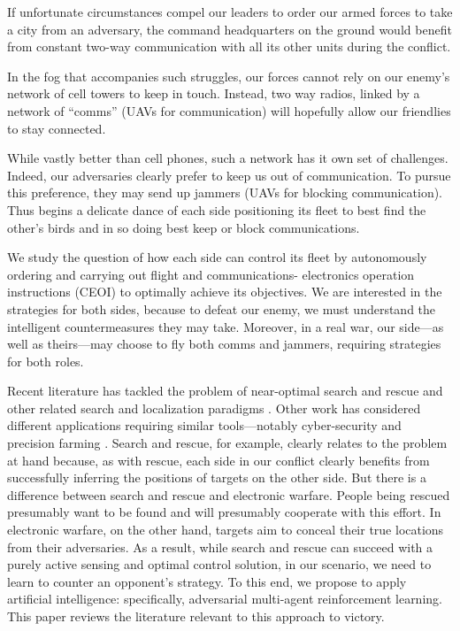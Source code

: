 \documentclass{article}
\begin{document}
If unfortunate circumstances compel our leaders to order our armed
forces to take a city from an adversary, the command headquarters on
the ground would benefit from constant two-way communication with all
its other units during the conflict.

In the fog that accompanies such struggles, our forces cannot rely on
our enemy's network of cell towers to keep in touch.  Instead, two way
radios, linked by a network of ``comms'' (UAVs for communication) will
hopefully allow our friendlies to stay connected.

While vastly better than cell phones, such a network has it own set of
challenges.  Indeed, our adversaries clearly prefer to keep us out of
communication.  To pursue this preference, they may send up jammers
(UAVs for blocking communication).  Thus begins a delicate dance of
each side positioning its fleet to best find the other's birds and in
so doing best keep or block communications.

We study the question of how each side can control its fleet by
autonomously ordering and carrying out flight and communications-
electronics operation instructions (CEOI) to optimally achieve its
objectives.  We are interested in the strategies for both sides,
because to defeat our enemy, we must understand the intelligent
countermeasures they may take. Moreover, in a real war, our side---as
well as theirs---may choose to fly both comms and jammers, requiring
strategies for both roles.

Recent literature has tackled the problem of near-optimal search and
rescue \cite{hoffmann2009mobile} and other related search and
localization paradigms \cite{ryan2010particle, tisdale2008multiple,
  gustafsson2002particle}.  Other work has considered different
applications requiring similar tools---notably cyber-security
\cite{nicholson2007information} and precision farming
\cite{testi2020reinforcement}.  Search and rescue, for example,
clearly relates to the problem at hand because, as with rescue, each
side in our conflict clearly benefits from successfully inferring the
positions of targets on the other side.  But there is a difference
between search and rescue and electronic warfare.  People being
rescued presumably want to be found and will presumably cooperate with
this effort.  In electronic warfare, on the other hand, targets aim to
conceal their true locations from their adversaries. As a result,
while search and rescue can succeed with a purely active sensing and
optimal control solution, in our scenario, we need to learn to counter
an opponent's strategy.  To this end, we propose to apply artificial
intelligence: specifically, adversarial multi-agent reinforcement
learning. This paper reviews the literature relevant to this approach
to victory.
\end{document}
